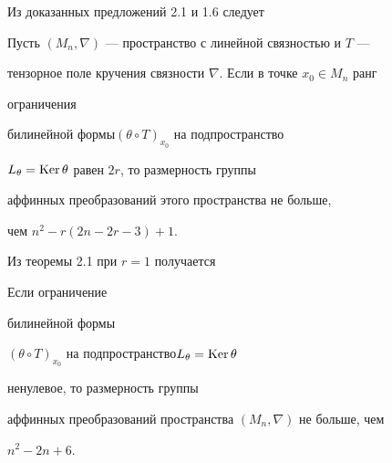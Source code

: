  


Из доказанных предложений 2.1 и 1.6 следует 


 


\begin{thms} 


Пусть $(M_n,\nabla)$ --- пространство с линейной связностью и $T$ ---  


тензорное поле кручения связности $\nabla$. Если в точке $x_0\in M_n$ ранг 


ограничения  


билинейной формы\linebreak $(\theta\circ T)_{x_0}$ на подпространство 


$L_\theta=\operatorname{Ker}\theta$ равен  $2r$, то размерность группы 


аффинных преобразований этого пространства не больше, 


чем $n^2-r(2n-2r-3)+1$. 


\end{thms} 


 


 


Из теоремы 2.1 при $r=1$ получается 


 


 


\begin{thms} Если ограничение 


билинейной формы  


$(\theta\circ T)_{x_0}$ на подпространство\linebreak $L_\theta=\operatorname{Ker}\theta$ 


ненулевое, то размерность группы 


аффинных преобразований пространства $(M_n,\nabla)$ не больше, чем  


$n^2-2n+6$. 


\end{thms} 


 


